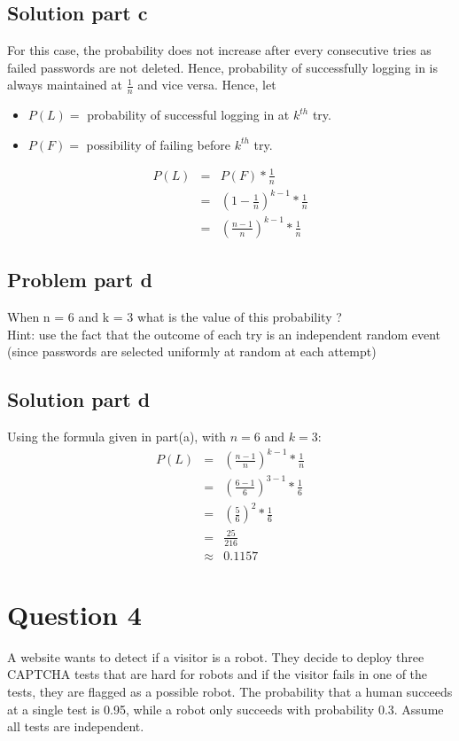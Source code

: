 \documentclass[12pt]{article}%
\begin{document}
\subsection*{Solution part c}
For this case, the probability does not increase after every consecutive tries as failed passwords are not deleted. Hence, probability of successfully logging in is always maintained at $\frac{1}{n}$ and vice versa. Hence, let
\begin{itemize}
\item $P(L) =$ probability of successful logging in at $k^{th}$ try.  
\item $P(F) =$ possibility of failing before $k^{th}$ try.
\end{itemize}
\begin{eqnarray*}
P(L) & = & P(F) * \frac{1}{n} \\
	 & = & (1 -\frac{1}{n})^{k-1} * \frac{1}{n} \\
	 & = & (\frac{n-1}{n})^{k-1} * \frac{1}{n} 	 
\end{eqnarray*}
\subsection*{Problem part d}
When n = 6 and k = 3 what is the value of this probability ? \\
Hint: use the fact that the outcome of each try is an independent random event (since passwords are selected uniformly at random at each attempt)
\subsection*{Solution part d}
Using the formula given in part(a), with $n = 6$ and $k = 3$:
\begin{eqnarray*}
P(L) & = & (\frac{n-1}{n})^{k-1} * \frac{1}{n} \\
	 & = & (\frac{6-1}{6})^{3-1} * \frac{1}{6} \\
     & = & (\frac{5}{6})^2 * \frac{1}{6} \\
     & = & \frac{25}{216} \\
     & \approx & 0.1157  
\end{eqnarray*}
\newpage
\section*{Question 4}
A website wants to detect if a visitor is a robot. They decide to deploy three CAPTCHA tests that are hard for robots and if the visitor fails in one of the tests, they are flagged as a possible robot. The probability that a human succeeds at a single test is 0.95, while a robot only succeeds with probability 0.3. Assume all tests are independent.
\end{document}
